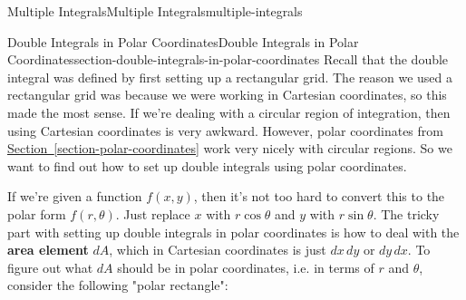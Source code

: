 \documentclass[oneside,10pt,]{book}
\newcommand{\terminology}[1]{\textbf{#1}}
\numberwithin{equation}{section}
\begin{document}
\begin{chapterptx}{Multiple Integrals}{}{Multiple Integrals}{}{}{multiple-integrals}
\begin{sectionptx}{Double Integrals in Polar Coordinates}{}{Double Integrals in Polar Coordinates}{}{}{section-double-integrals-in-polar-coordinates}
\hypertarget{p-1488}{}%
Recall that the double integral was defined by first setting up a rectangular grid. The reason we used a rectangular grid was because we were working in Cartesian coordinates, so this made the most sense. If we're dealing with a circular region of integration, then using Cartesian coordinates is very awkward. However, polar coordinates from \hyperref[section-polar-coordinates]{Section~\ref{section-polar-coordinates}} work very nicely with circular regions. So we want to find out how to set up double integrals using polar coordinates.%
\par
\hypertarget{p-1489}{}%
If we're given a function \(f(x,y)\), then it's not too hard to convert this to the polar form \(f(r,\theta)\). Just replace \(x\) with \(r\cos\theta\) and \(y\) with \(r\sin\theta\). The tricky part with setting up double integrals in polar coordinates is how to deal with the \terminology{area element} \(dA\), which in Cartesian coordinates is just \(dx\,dy\) or \(dy\,dx\). To figure out what \(dA\) should be in polar coordinates, i.e. in terms of \(r\) and \(\theta\), consider the following "polar rectangle": \begin{figure}
\centering
{
}
\end{figure}
\end{sectionptx}
\end{chapterptx}
\end{document}
